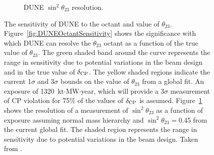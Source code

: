 \begin{figure}
\begin{subfigure}[t]{0.48\linewidth}
    \caption{DUNE $\sin^2{\theta_{23}}$ resolution.}
    \label{fig:DUNETheta23Resolution}
  \end{subfigure}
  \caption[The sensitivity of DUNE to the octant and value of $\theta_{23}$.]{The sensitivity of DUNE to the octant and value of $\theta_{23}$.  Figure~\ref{fig:DUNEOctantSensitivity} shows the significance with which DUNE can resolve the $\theta_{23}$ octant as a function of the true value of $\theta_{23}$.  The green shaded band around the curve represents the range in sensitivity due to potential variations in the beam design and in the true value of $\delta_{\textnormal{CP}}$.  The yellow shaded regions indicate the current 1$\sigma$ and 3$\sigma$ bounds on the value of $\theta_{23}$ from a global fit.  An exposure of 1320~kt$\cdot$MW$\cdot$year, which will provide a 3$\sigma$ measurement of CP violation for 75\% of the values of $\delta_{\textnormal{CP}}$ is assumed.  Figure~\ref{fig:DUNETheta23Resolution} shows the resolution of a measurement of $\sin^2{\theta_{23}}$ as a function of exposure assuming normal mass hierarchy and $\sin^2{\theta_{23}}=0.45$ from the current global fit.  The shaded region represents the range in sensitivity due to potential variations in the beam design.  Taken from \cite{DUNECDR2}.}
  \label{fig:DUNETheta23}
\end{figure}

